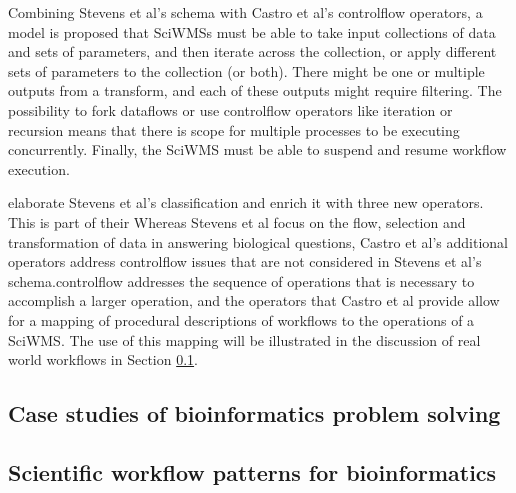 \documentclass[a4paper,10pt]{scrreprt}
\begin{document}
Combining Stevens et al's schema with Castro et al's \gls{controlflow} operators, a model is proposed that
\glspl{SciWMS} must be able to take input collections of data and sets of parameters, and then iterate 
across the collection, or apply different sets of parameters to the collection (or both). There might be
one or multiple outputs from a transform, and each of these outputs might require filtering. The possibility
to fork \glspl{dataflow} or use \gls{controlflow} operators like iteration or recursion means that there 
is scope for multiple processes to be executing concurrently. Finally, the \gls{SciWMS} must be able
to suspend and resume workflow execution.



elaborate Stevens et al's classification and enrich it with three new operators. This is part of their Whereas Stevens et al focus on the flow, selection and transformation of data in answering biological questions, Castro et al's additional operators address \gls{controlflow} issues that are not considered in Stevens et al's schema.\Gls{controlflow} addresses the sequence of operations that is necessary to accomplish a larger operation, and the operators that Castro et al provide allow for a mapping of procedural descriptions of \glspl{workflow} to the operations of a \gls{SciWMS}. The use of this mapping will be illustrated in the discussion of real world \glspl{workflow} in Section \ref{sec:case_studies}.


\subsection{Case studies of bioinformatics problem solving}
\label{sec:case_studies}
\subsection{Scientific workflow patterns for bioinformatics}
\label{sec:workflow_patterns}
\end{document}
